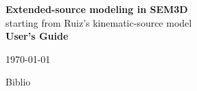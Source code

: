 \documentclass[letterpaper,11pt,titlepage,final]{report}
\def\MonthYear{\today}
\begin{document}
\parindent 0pt
\parskip 10pt


\thispagestyle{empty}
\vspace*{\fill}
\begin{center}


\vspace*{1mm}
{\Huge\bf{ Extended-source modeling in SEM3D}}\\[2mm]
{\Large starting from Ruiz's kinematic-source model  }\\[5mm]
{\Large \bf{User's Guide}}





\vspace*{3cm}
\fdunB
\MonthYear \\[3cm]
\end{center}
\vfill
\thispagestyle{empty}
\hspace*{0pt}
\newpage
\thispagestyle{empty}
\vspace*{\fill}


\newpage
{\parskip 0pt
  \tableofcontents
}
\newpage





 {Biblio}
\end{document}
